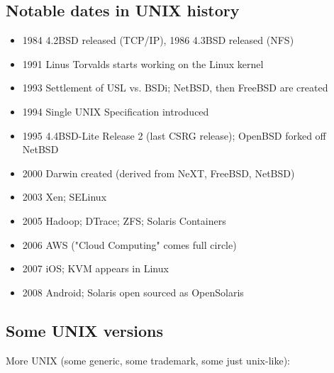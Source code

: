 \documentclass[xga]{xdvislides}
\begin{document}
\subsection{Notable dates in UNIX history}
\begin{itemize}
	\item 1984 4.2BSD released (TCP/IP), 1986 4.3BSD released (NFS)
	\item 1991 Linus Torvalds starts working on the Linux kernel
	\item 1993 Settlement of USL vs. BSDi; NetBSD, then FreeBSD are created
	\item 1994 Single UNIX Specification introduced
	\item 1995 4.4BSD-Lite Release 2 (last CSRG release); OpenBSD
		forked off NetBSD
	\item 2000 Darwin created (derived from NeXT, FreeBSD, NetBSD)
	\item 2003 Xen; SELinux
	\item 2005 Hadoop; DTrace; ZFS; Solaris Containers
	\item 2006 AWS ("Cloud Computing" comes full circle)
	\item 2007 iOS; KVM appears in Linux
	\item 2008 Android; Solaris open sourced as OpenSolaris
\end{itemize}

\subsection{Some UNIX versions}
More UNIX (some generic, some trademark, some just unix-like):
\\
\end{document}
